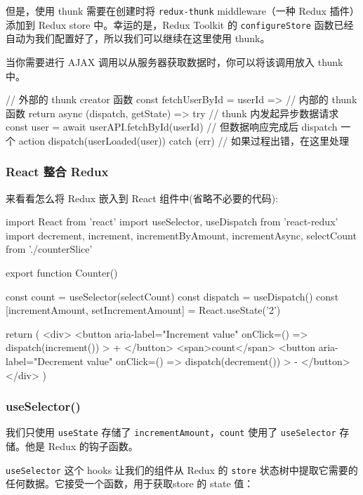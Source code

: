 但是，使用 thunk 需要在创建时将 \texttt{redux-thunk} middleware（一种 Redux 插件）添加到 Redux store 中。幸运的是，Redux Toolkit 的 \texttt{configureStore} 函数已经自动为我们配置好了，所以我们可以继续在这里使用 thunk。

当你需要进行 AJAX 调用以从服务器获取数据时，你可以将该调用放入 thunk 中。

\begin{JavaScript}
// 外部的 thunk creator 函数
const fetchUserById = userId => {
  // 内部的 thunk 函数
  return async (dispatch, getState) => {
    try {
      // thunk 内发起异步数据请求
      const user = await userAPI.fetchById(userId)
      // 但数据响应完成后 dispatch 一个 action
      dispatch(userLoaded(user))
    } catch (err) {
      // 如果过程出错，在这里处理
    }
  }
}
\end{JavaScript}

\subsubsection{React 整合 Redux}

来看看怎么将 Redux 嵌入到 React 组件中(省略不必要的代码):

\begin{JavaScript}
import React from 'react'
import { useSelector, useDispatch } from 'react-redux'
import { decrement, increment, incrementByAmount, incrementAsync, selectCount } from './counterSlice'

export function Counter() {
  const count = useSelector(selectCount)
  const dispatch = useDispatch()
  const [incrementAmount, setIncrementAmount] = React.useState('2')

  return (
    <div>
      <button
        aria-label="Increment value"
        onClick={() => dispatch(increment())}
      >
        +
      </button>
      <span>{count}</span>
      <button
        aria-label="Decrement value"
        onClick={() => dispatch(decrement())}
      >
        -
      </button>
    </div>
  )
}
\end{JavaScript}

\subsubsection*{useSelector()}

我们只使用 \texttt{useState} 存储了 \texttt{incrementAmount}，\texttt{count} 使用了 \texttt{useSelector} 存储。他是 Redux 的钩子函数。

\texttt{useSelector} 这个 hooks 让我们的组件从 Redux 的 \texttt{store} 状态树中提取它需要的任何数据。它接受一个函数，用于获取store 的 state 值：

